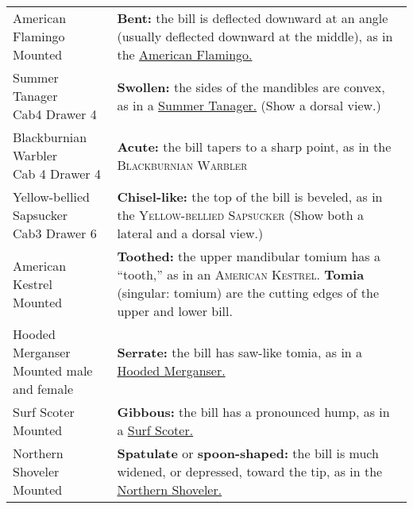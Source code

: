 \documentclass[10pt]{article}
\newif\ifprintkey
\newcommand{\PrintKey}[1]{\ifprintkey{\textbf{#1}}\fi}
\begin{document}
\begin{longtable}{@{}C{0.45\textwidth}L{0.45\textwidth}@{}}
%
\PrintKey{American Flamingo \newline Mounted}%
& \textbf{Bent:} the bill is deflected downward at an angle (usually deflected downward at the middle), as in the \href{https://ebird.org/species/grefla2}{American Flamingo.} \\ [2.5cm]
%
\PrintKey{Summer Tanager \newline Cab4 Drawer 4} & \textbf{Swollen:} the sides of the mandibles are convex, as in a \href{https://www.allaboutbirds.org/guide/Summer_Tanager}{Summer Tanager.} (Show a dorsal view.)\\ [2.5cm]
%
\PrintKey{Blackburnian Warbler \newline Cab 4 Drawer 4} & \textbf{Acute:} the bill tapers to a sharp point, as in the \textsc{Blackburnian Warbler} %
\\ [2.5cm]
%
\PrintKey{Yellow-bellied Sapsucker \newline Cab3 Drawer 6} & \textbf{Chisel-like:} the top of the bill is beveled, as in the \textsc{Yellow-bellied Sapsucker} %
(Show both a lateral and a dorsal view.) \\ [2.5cm]
%
\PrintKey{American Kestrel \newline Mounted} & \textbf{Toothed:} the upper mandibular tomium has a “tooth,” as in an \textsc{American Kestrel.} %
\textbf{Tomia} (singular: tomium) are the cutting edges of the upper and lower bill.\\ [2.5cm]
%
\PrintKey{Hooded Merganser \newline Mounted male and female}& \textbf{Serrate:} the bill has saw-like tomia, as in a \href{https://www.allaboutbirds.org/guide/Hooded_Merganser}{Hooded Merganser.} \\ [2.5cm]
%
\PrintKey{Surf Scoter \newline Mounted} %
& \textbf{Gibbous:} the bill has a pronounced hump, as in a \href{https://www.allaboutbirds.org/guide/Surf_Scoter}{Surf Scoter.}\\ [2.5cm]
%
\PrintKey{Northern Shoveler \newline Mounted} & \textbf{Spatulate} or \textbf{spoon-shaped:} the bill is much widened, or depressed, toward the tip, as in the \href{https://www.allaboutbirds.org/guide/Northern_Shoveler}{Northern Shoveler.}\\ [2.5cm]

\end{longtable}
\end{document}
